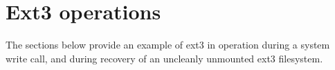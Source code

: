 



\section{Ext3 operations}

The sections below provide an example of ext3 in operation during a system write call, and during recovery of an uncleanly unmounted ext3 filesystem.

%

